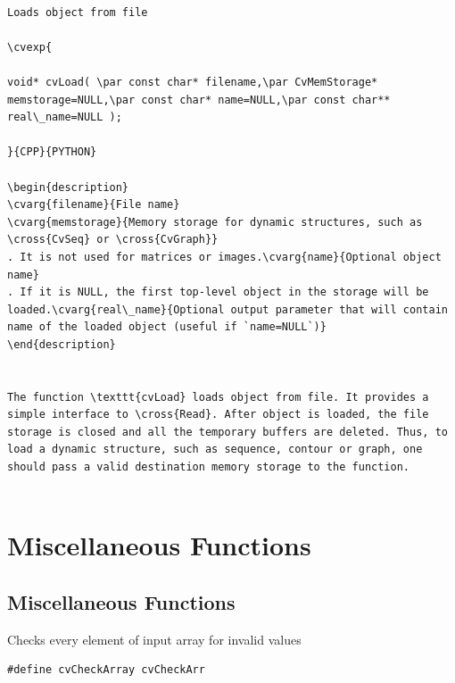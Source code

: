 \begin{verbatim}

Loads object from file

\cvexp{

void* cvLoad( \par const char* filename,\par CvMemStorage* memstorage=NULL,\par const char* name=NULL,\par const char** real\_name=NULL );

}{CPP}{PYTHON}

\begin{description}
\cvarg{filename}{File name}
\cvarg{memstorage}{Memory storage for dynamic structures, such as \cross{CvSeq} or \cross{CvGraph}}
. It is not used for matrices or images.\cvarg{name}{Optional object name}
. If it is NULL, the first top-level object in the storage will be loaded.\cvarg{real\_name}{Optional output parameter that will contain name of the loaded object (useful if `name=NULL`)}
\end{description}


The function \texttt{cvLoad} loads object from file. It provides a simple interface to \cross{Read}. After object is loaded, the file storage is closed and all the temporary buffers are deleted. Thus, to load a dynamic structure, such as sequence, contour or graph, one should pass a valid destination memory storage to the function.


\end{verbatim}
\section{Miscellaneous Functions}

\subsection{Miscellaneous Functions}

\label{CheckArr}

Checks every element of input array for invalid values

\begin{lstlisting}
#define cvCheckArray cvCheckArr
\end{lstlisting}

